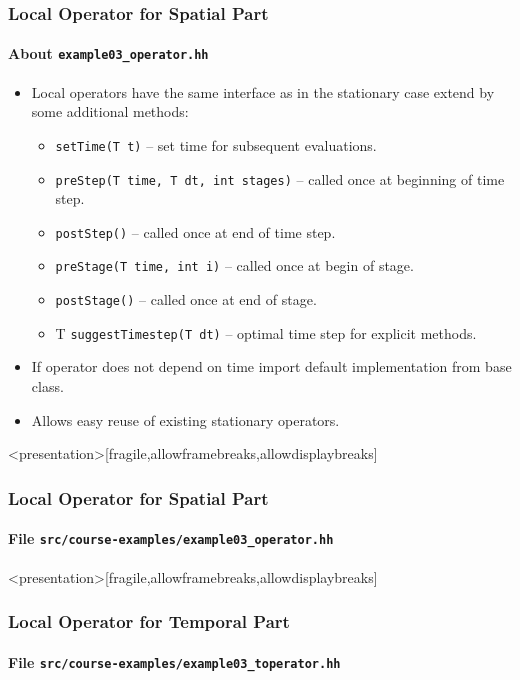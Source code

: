 \begin{frame}
\frametitle{Local Operator for Spatial Part}
\framesubtitle{About \lstinline{example03_operator.hh}}
\begin{itemize}
\item Local operators have the same interface as in the stationary case extend by some additional methods:
\begin{itemize}
\item \lstinline{setTime(T t)} -- set time for subsequent evaluations.
\item \lstinline{preStep(T time, T dt, int stages)} -- called once at beginning of time step.
\item \lstinline{postStep()} -- called once at end of time step.
\item \lstinline{preStage(T time, int i)} -- called once at begin of stage.
\item \lstinline{postStage()} -- called once at end of stage.
\item T \lstinline{suggestTimestep(T dt)} -- optimal time step for explicit methods.
\end{itemize}
\item If operator does not depend on time import default implementation from base class.
\item Allows easy reuse of existing stationary operators.
\end{itemize}
\end{frame}

\begin{frame}<presentation>[fragile,allowframebreaks,allowdisplaybreaks]
\frametitle<presentation>{Local Operator for Spatial Part}
\framesubtitle<presentation>{File \texttt{src/course-examples/example03\_operator.hh}}

\end{frame}

\begin{frame}<presentation>[fragile,allowframebreaks,allowdisplaybreaks]
\frametitle<presentation>{Local Operator for Temporal Part}
\framesubtitle<presentation>{File \texttt{src/course-examples/example03\_toperator.hh}}

\end{frame}

